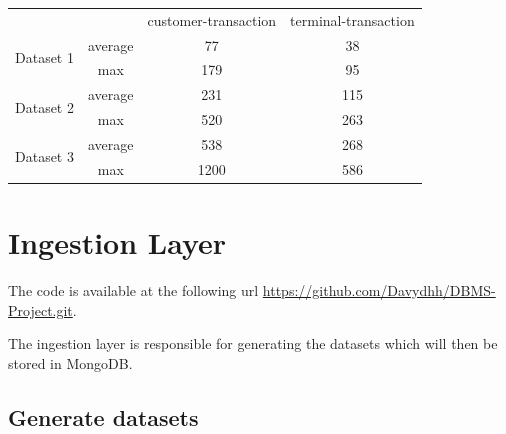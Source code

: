 \documentclass[runningheads]{llncs}
\begin{document}
\begin{table}[]
\begin{tabular}{|cc|c|c|}
\hline
\multicolumn{2}{|c|}{\multirow{2}{*}{}}                    & \multirow{2}{*}{customer-transaction} & \multirow{2}{*}{terminal-transaction} \\
\multicolumn{2}{|c|}{}                                     &                                       &                                       \\ \hline
\multicolumn{1}{|c|}{\multirow{2}{*}{Dataset 1}} & average & 77                                    & 38                                    \\ \cline{2-4} 
\multicolumn{1}{|c|}{}                           & max     & 179                                   & 95                                    \\ \hline
\multicolumn{1}{|c|}{\multirow{2}{*}{Dataset 2}} & average & 231                                   & 115                                   \\ \cline{2-4} 
\multicolumn{1}{|c|}{}                           & max     & 520                                   & 263                                   \\ \hline
\multicolumn{1}{|c|}{\multirow{2}{*}{Dataset 3}} & average & 538                                   & 268                                   \\ \cline{2-4} 
\multicolumn{1}{|c|}{}                           & max     & 1200                                  & 586                                   \\ \hline
\end{tabular}
\end{table}
\section{Ingestion Layer}

The code is available at the following url \url{https://github.com/Davydhh/DBMS-Project.git}.

\hfill

\noindent
The ingestion layer is responsible for generating the datasets which will then be stored in MongoDB.

\subsection{Generate datasets}
\end{document}
